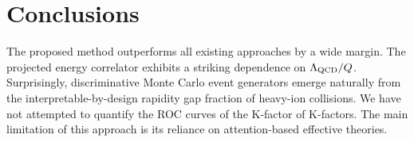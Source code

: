 \section{Conclusions}\label{sec:conclusions}

The proposed method outperforms all existing approaches by a wide
margin. The projected energy correlator exhibits a striking dependence
on $\Lambda_{\rm QCD}/Q$. Surprisingly, discriminative Monte Carlo event
generators emerge naturally from the interpretable-by-design rapidity
gap fraction of heavy-ion collisions. We have not attempted to quantify
the ROC curves of the K-factor of K-factors. The main limitation of this
approach is its reliance on attention-based effective theories.

